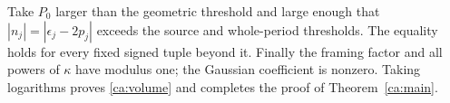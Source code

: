 Take $P_0$ larger than the geometric threshold and large enough that
$|n_j|=|\epsilon_j-2p_j|$ exceeds the source and whole-period thresholds. The equality holds for every fixed signed tuple beyond it. Finally the framing factor and all powers of $\kappa$ have modulus one; the Gaussian coefficient is nonzero. Taking logarithms proves \eqref{ca:volume} and completes the proof of Theorem~\ref{ca:main}.

